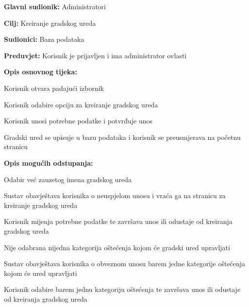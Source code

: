 \noindent {}
\begin{packed_item}

	\item \textbf{Glavni sudionik: }Administratori
	\item  \textbf{Cilj:} Kreiranje gradskog ureda
	\item  \textbf{Sudionici:} Baza podataka
	\item  \textbf{Preduvjet:} Korisnik je prijavljen i ima administrator ovlasti
	\item  \textbf{Opis osnovnog tijeka:}

	\item[] \begin{packed_enum}

		\item Korisnik otvara padajući izbornik
		\item Korisnik odabire opciju za kreiranje gradskog ureda
		\item Korisnik unosi potrebne podatke i potvrđuje unos
		\item Gradski ured se upisuje u bazu podataka i korisnik se preusmjerava na početnu stranicu

	\end{packed_enum}

	\item  \textbf{Opis mogućih odstupanja:}

	\item[] \begin{packed_item}

		\item[3.a] Odabir već zauzetog imena gradskog ureda
		\item[] \begin{packed_enum}

			\item Sustav obavještava korisnika o neuspjelom unosu i vraća ga na stranicu za kreiranje gradskog ureda
			\item Korisnik mijenja potrebne podatke te završava unos ili odustaje od kreiranja gradskog ureda

		\end{packed_enum}
		\item[3.b] Nije odabrana nijedna kategorija oštećenja kojom će gradski ured upravljati
		\item[] \begin{packed_enum}

			\item Sustav obavještava korisnika o obveznom unosu barem jedne kategorije oštećenja kojom će ured upravljati
			\item Korisnik odabire barem jednu kategoriju oštećenja te završava unos ili odustaje od kreiranja gradskog ureda

		\end{packed_enum}

	\end{packed_item}
\end{packed_item}


